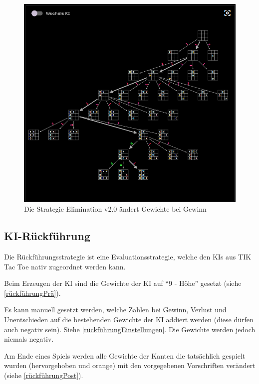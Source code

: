\documentclass[titlepage]{scrartcl}
\newcommand{\TicTacToe}{TI\reflectbox K Tac Toe}
\begin{document}
\begin{figure}[htb]
\includegraphics[width = \linewidth]{elimination2.png}
\caption{Die Strategie Elimination v2.0 ändert Gewichte bei Gewinn}
\label{elimination2}
\end{figure}

\pagebreak

\subsection{KI-Rückführung}
Die Rückführungsstrategie ist eine Evaluationsstrategie, welche den KIs aus \TicTacToe{} nativ zugeordnet werden kann.

Beim Erzeugen der KI sind die Gewichte der KI auf "`9 - Höhe"' gesetzt (siehe \ref{rückführungPrä}).

Es kann manuell gesetzt werden, welche Zahlen bei Gewinn, Verlust und Unentschieden auf die bestehenden Gewichte der KI addiert werden (diese dürfen auch negativ sein).
Siehe \ref{rückführungEinstellungen}.
Die Gewichte werden jedoch niemals negativ.

Am Ende eines Spiels werden alle Gewichte der Kanten die tatsächlich gespielt wurden (hervorgehoben und orange) mit den vorgegebenen Vorschriften verändert (siehe \ref{rückführungPost}).
\end{document}
